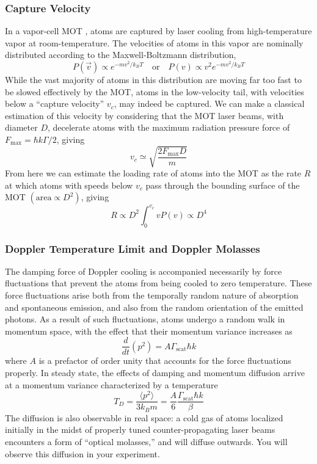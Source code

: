 \documentclass{../lab}
\begin{document}
\subsubsection{Capture Velocity}
\label{subsubsec:CaptureVelocity}

In a vapor-cell MOT \cite{Monroe}, atoms are captured by laser cooling from high-temperature vapor at room-temperature. The velocities of atoms in this vapor are nominally distributed according to the Maxwell-Boltzmann distribution,
\begin{equation}
    P(\vec{v}) \propto e^{-mv^2/k_BT}
    \quad \text{or} \quad
    P(v) \propto v^2e^{-mv^2/k_BT}
\end{equation}
While the vast majority of atoms in this distribution are moving far too fast to be slowed effectively by the MOT, atoms in the low-velocity tail, with velocities below a ``capture velocity'' $v_c$, may indeed be captured. We can make a classical estimation of this velocity by considering that the MOT laser beams, with diameter $D$, decelerate atoms with the maximum radiation pressure force of $F_\text{max} = \hbar k \Gamma/2$, giving
\begin{equation}
    v_c \simeq \sqrt{\frac{2F_\text{max}D}{m}}
\end{equation}
From here we can estimate the loading rate of atoms into the MOT as the rate $R$ at which atoms with speeds below $v_c$ pass through the bounding surface of the MOT $\left(\text{area} \propto D^2\right)$, giving
\begin{equation}
    R \propto D^2 \int_0^{v_c} v P(v) \propto D^4
\end{equation}

\subsubsection{Doppler Temperature Limit and Doppler Molasses}

The damping force of Doppler cooling is accompanied necessarily by force fluctuations that prevent the atoms from being cooled to zero temperature. These force fluctuations arise both from the temporally random nature of absorption and spontaneous emission, and also from the random orientation of the emitted photons. As a result of such fluctuations, atoms undergo a random walk in momentum space, with the effect that their momentum variance increases as
\begin{equation}
    \frac{d}{dt}(p^2) = A\Gamma_\text{scat}\hbar k
\end{equation}
where $ A$ is a prefactor of order unity that accounts for the force fluctuations properly. In steady state, the effects of damping and momentum diffusion arrive at a momentum variance characterized by a temperature
\begin{equation}
    T_D = \frac{\langle p^2\rangle}{3 k_B m} = \frac{A}{6}\frac{\Gamma_\text{scat}\hbar k}{\beta}
\end{equation}
The diffusion is also observable in real space: a cold gas of atoms localized initially in the midst of properly tuned counter-propagating laser beams encounters a form of ``optical molasses,'' and will diffuse outwards. You will observe this diffusion in your experiment.
\end{document}
